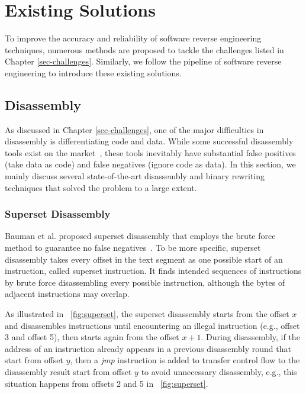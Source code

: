 \chapter{Existing Solutions}\label{sec-existing-solutions}

To improve the accuracy and reliability of software reverse engineering
techniques, numerous methods are proposed to tackle the challenges listed in
Chapter \ref{sec-challenges}.
Similarly, we follow the pipeline of software reverse engineering to introduce
these existing solutions.

\section{Disassembly} \label{sec:existing-disassembly}
As discussed in Chapter \ref{sec-challenges}, one of the major difficulties in
disassembly is differentiating code and data. While some successful disassembly
tools exist on the market~\cite{hex2014ida,kvroustek2017retdec,ghidra,radare},
these tools inevitably have substantial false positives (take data as code) and
false negatives (ignore code as data). In this section, we mainly discuss
several state-of-the-art disassembly and binary rewriting techniques that
solved the problem to a large extent.

\subsection{Superset Disassembly} \label{sec:existing-superset}
Bauman et al. proposed superset disassembly that employs the brute force
method to guarantee no false negatives~\cite{bauman2018superset}. To be more
specific, superset disassembly takes every offset in the text segment as one
possible start of an instruction, called superset instruction. It finds
intended sequences of instructions by brute force disassembling every possible
instruction, although the bytes of adjacent instructions may overlap.

As illustrated in \F~\ref{fig:superset}, the superset disassembly starts from
the offset $x$ and disassembles instructions until encountering an illegal
instruction (e.g., offset 3 and offset 5), then starts again from the offset
$x+1$. During disassembly, if the address of an instruction already appears in
a previous disassembly round that start from offset $y$, then a \textit{jmp}
instruction is added to transfer control flow to the disassembly result start
from offset $y$ to avoid unnecessary disassembly, e.g., this situation happens
from offsets 2 and 5 in \F~\ref{fig:superset}.

